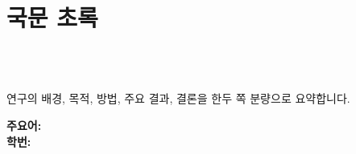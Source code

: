 \chapter*{국문 초록}

\begin{center}
  {\large\bfseries \ThesisTitleKo\par}
  \vspace{4mm}
  \AuthorKo\\ \UniversityKo\ \DepartmentKo
\end{center}
\vspace{6mm}

연구의 배경, 목적, 방법, 주요 결과, 결론을 한두 쪽 분량으로 요약합니다.

\vspace{6mm}
\noindent\textbf{주요어:} \KeywordsKo\\
\noindent\textbf{학\hspace{1em}번:} \StudentID
\clearpage
